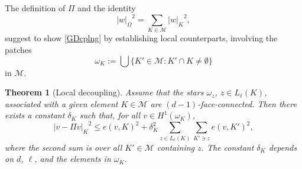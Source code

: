 \documentclass[a4paper]{amsart}
\numberwithin{equation}{section}
\theoremstyle{plain}
\newtheorem{thm}{Theorem}[section]
\theoremstyle{definition}
\begin{document}
The definition of $\Pi$ and the identity
\[
 {\left|{w}\right|_{{\Omega}}}^2
 =
 \sum_{{K}\in{\mathcal{M}}}{\left|{w}\right|_{K}}^2,
\]
suggest to show \eqref{GDcplng} by establishing local counterparts, involving
the patches
\[
 \omega_{K}
 {:=}
 \bigcup \{{K}'\in{\mathcal{M}}:{K}'\cap{K}\neq\emptyset\}
\]
in ${\mathcal{M}}$.
\begin{thm}[Local decoupling]
\label{T:LDcplng}
Assume that the stars $\omega_z$, $z\in{L_{{\ell}}}({K})$, associated with 
a given element ${K}\in{\mathcal{M}}$ are $(d-1)$-face-connected.  Then there exists a 
constant ${\delta}_{K}$ such that, for all $v\in{H^{1}}(\omega_{K})$,
\begin{equation}
\label{LDcplng}
 {\left|{v - {\Pi} v}\right|_{K}}^2
 \leq
 e(v,{K})^2 
 +
 {\delta}_{K}^2
 \sum_{z\in{L_{{\ell}}}({K})} \sum_{{K}'\ni z} e(v,{K}')^2,
\end{equation}
where the second sum is over all ${K}'\in{\mathcal{M}}$ containing $z$.  The constant 
${\delta}_{K}$ depends on $d$, $\ell$, and the elements in $\omega_{K}$.
\end{thm}
\end{document}
